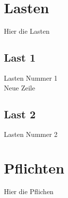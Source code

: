 \documentclass[a4paper,12pt]{article}
\title{\projektName}
\author{\authorName}
\date{\today}
\begin{document}
    
    \setcounter{page}{2}
    \setcounter{tocdepth}{4}
    \setcounter{secnumdepth}{4}
    \tableofcontents
    \clearpage
 
	\begin{abstract}
		Abstrakte Beschreibung.
	\end{abstract}	
	\clearpage
 
	\section{Lasten}
 	Hier die Lasten
		\subsection{Last 1}
 		Lasten Nummer 1\\Neue Zeile
		\subsection{Last 2}
 		Lasten Nummer 2
 	\clearpage

	\section{Pflichten}
 	Hier die Pflichen
\end{document}
